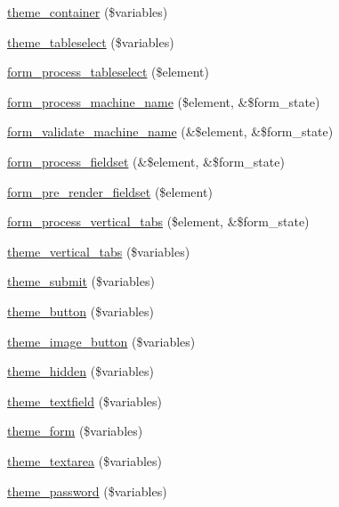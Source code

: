 \begin{DoxyCompactItemize}
\hyperlink{group__themeable_ga281b0f3a41586bc5ff324919699e902f}{theme\_\-container} (\$variables)
\item 
\hyperlink{group__themeable_ga5cc90870843319efb27065ce5db8e413}{theme\_\-tableselect} (\$variables)
\item 
\hyperlink{group__form__api_ga4dc085d5191106b1a649c6df67feee30}{form\_\-process\_\-tableselect} (\$element)
\item 
\hyperlink{group__form__api_gacc2045f1fc86919221685bd809d22812}{form\_\-process\_\-machine\_\-name} (\$element, \&\$form\_\-state)
\item 
\hyperlink{group__form__api_ga22965a0e68fef7765e0eb2c475440e55}{form\_\-validate\_\-machine\_\-name} (\&\$element, \&\$form\_\-state)
\item 
\hyperlink{group__form__api_gae2acfa7f531c487ac930d3a819ee63b5}{form\_\-process\_\-fieldset} (\&\$element, \&\$form\_\-state)
\item 
\hyperlink{group__form__api_ga10c77d235a5451895a3d2862b1ff4e34}{form\_\-pre\_\-render\_\-fieldset} (\$element)
\item 
\hyperlink{group__form__api_gaad2f405e02e146b5cfe75912a67964d6}{form\_\-process\_\-vertical\_\-tabs} (\$element, \&\$form\_\-state)
\item 
\hyperlink{group__themeable_ga7014edeff2fd0c053bbec25fe9a4932c}{theme\_\-vertical\_\-tabs} (\$variables)
\item 
\hyperlink{group__themeable_ga6785cbeb4d96c1b2a1dd58f8648ed4cc}{theme\_\-submit} (\$variables)
\item 
\hyperlink{group__themeable_ga6f85ebe1bce115aaa66a8e0eb4c7e001}{theme\_\-button} (\$variables)
\item 
\hyperlink{group__themeable_ga599eaa99635a647741a19b4c23ed1233}{theme\_\-image\_\-button} (\$variables)
\item 
\hyperlink{group__themeable_gaa3463af7c6de7aaa4f5c904a8d23fbaf}{theme\_\-hidden} (\$variables)
\item 
\hyperlink{group__themeable_ga1c1ad681858baaf35a5ad1d0e8d4b65b}{theme\_\-textfield} (\$variables)
\item 
\hyperlink{group__themeable_ga8b9e6ce7a301b1e072f8e83525cd7ba6}{theme\_\-form} (\$variables)
\item 
\hyperlink{group__themeable_ga39add5682e6e4a90866a9337d81cfa94}{theme\_\-textarea} (\$variables)
\item 
\hyperlink{group__themeable_gabef0b99822b6dcb684b2a447f49a8086}{theme\_\-password} (\$variables)
\item 

\end{DoxyCompactItemize}
